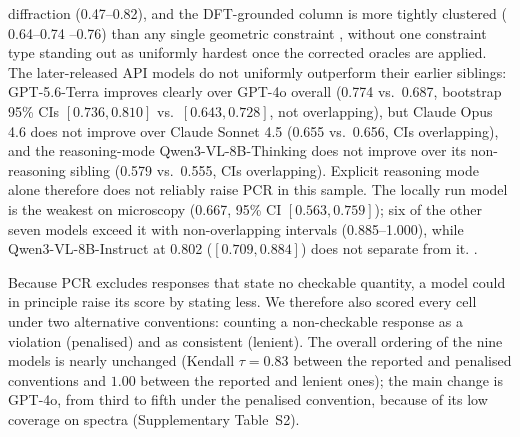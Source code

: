 \documentclass[pdflatex,sn-nature]{sn-jnl}
\newcommand{\rev}[1]{#1} %
\newcommand{\rev}[1]{{\color{blue}#1}} %
\providecommand{\DIFadd}[1]{{\protect\color{blue} \sf #1}} %
\providecommand{\DIFdel}[1]{{\protect\color{red} \scriptsize #1}} %
\providecommand{\DIFaddbegin}{} %
\providecommand{\DIFaddend}{} %
\providecommand{\DIFdelbegin}{} %
\providecommand{\DIFdelend}{} %
\providecommand{\DIFscaledelfig}{0.5}
\newlength{\DIFdelgraphicswidth} %
\newlength{\DIFdelgraphicsheight} %
\providecommand{\DIFaddincludegraphics}[2][]{{\color{blue}\fbox{\DIFOincludegraphics[#1]{#2}}}} %
\providecommand{\DIFdelincludegraphics}[2][]{%
\sbox{\DIFdelgraphicsbox}{\DIFOincludegraphics[#1]{#2}}%
\settoboxwidth{\DIFdelgraphicswidth}{\DIFdelgraphicsbox} %
\settoboxtotalheight{\DIFdelgraphicsheight}{\DIFdelgraphicsbox} %
\scalebox{\DIFscaledelfig}{%
\parbox[b]{\DIFdelgraphicswidth}{\usebox{\DIFdelgraphicsbox}\\[-\baselineskip] \rule{\DIFdelgraphicswidth}{0em}}\llap{\resizebox{\DIFdelgraphicswidth}{\DIFdelgraphicsheight}{%
\setlength{\unitlength}{\DIFdelgraphicswidth}%
\begin{picture}(1,1)%
\thicklines\linethickness{2pt} %
{\color[rgb]{1,0,0}\put(0,0){\framebox(1,1){}}}%
{\color[rgb]{1,0,0}\put(0,0){\line( 1,1){1}}}%
{\color[rgb]{1,0,0}\put(0,1){\line(1,-1){1}}}%
\end{picture}%
}\hspace*{3pt}}} %
} %
\DeclareRobustCommand{\DIFaddbegin}{\DIFOaddbegin \let\includegraphics\DIFaddincludegraphics} %
\DeclareRobustCommand{\DIFaddend}{\DIFOaddend \let\includegraphics\DIFOincludegraphics} %
\DeclareRobustCommand{\DIFdelbegin}{\DIFOdelbegin \let\includegraphics\DIFdelincludegraphics} %
\DeclareRobustCommand{\DIFdelend}{\DIFOaddend \let\includegraphics\DIFOincludegraphics} %
\begin{document}
diffraction (0.47--0.82), and the DFT-grounded column is more tightly clustered
(\DIFdelbegin \DIFdel{0.64--0.74}\DIFdelend \DIFaddbegin \DIFadd{\rev{0.65--0.76}}\DIFaddend ) than any single geometric constraint\DIFdelbegin \DIFdel{, without one constraint type standing
out as uniformly hardest once the corrected oracles are applied. The later-released API models do not uniformly outperform their
earlier siblings: GPT-5.6-Terra improves clearly over GPT-4o
overall (0.774 vs.\ 0.687, bootstrap 95\% CIs $[0.736,0.810]$ vs.\ $[0.643,0.728]$, not
overlapping), but Claude Opus 4.6 does not improve over Claude Sonnet 4.5 (0.655 vs.\
0.656, CIs overlapping), and the reasoning-mode Qwen3-VL-8B-Thinking does not improve over
its non-reasoning sibling (0.579 vs.\ 0.555, CIs overlapping). Explicit reasoning
mode alone therefore does not reliably raise PCR in this sample. The locally run model is the weakest on microscopy
(0.667, 95\% CI $[0.563,0.759]$); six of the other seven models exceed it with
non-overlapping intervals (0.885--1.000), while Qwen3-VL-8B-Instruct at 0.802
($[0.709,0.884]$) does not separate from it. }\DIFdelend \DIFaddbegin \DIFadd{\rev{.}
}

\DIFadd{\rev{Because PCR excludes responses that state no checkable quantity, a model could in
principle raise its score by stating less. We therefore also scored every cell under two
alternative conventions: counting a non-checkable response as a violation (penalised) and as
consistent (lenient). The overall ordering of the nine models is nearly unchanged (Kendall
$\tau=0.83$ between the reported and penalised conventions and $1.00$ between the reported and
lenient ones); the main change is GPT-4o, from third to fifth under the penalised
convention, because of its low coverage on spectra (Supplementary Table~S2).}
}
\end{document}
